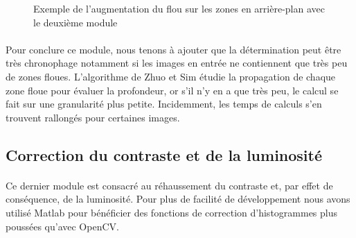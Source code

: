 \documentclass[11pt, french]{report-rd-info}
\begin{document}
\begin{figure}[htp]
 \caption{Exemple de l'augmentation du flou sur les zones en arrière-plan avec le deuxième module}
 \label{fig:ProfExemple}
\end{figure}

\paragraph*{}
Pour conclure ce module, nous tenons à ajouter que la détermination peut être très chronophage notamment si les images en entrée ne contiennent que très peu de zones floues. L'algorithme de Zhuo et Sim \cite{Zhuo2011} étudie la propagation de chaque zone floue pour évaluer la profondeur, or s'il n'y en a que très peu, le calcul se fait sur une granularité plus petite. Incidemment, les temps de calculs s'en trouvent rallongés pour certaines images. 

\subsection{Correction du contraste et de la luminosité}
\paragraph*{}
Ce dernier module est consacré au réhaussement du contraste et, par effet de conséquence, de la luminosité. Pour plus de facilité de développement nous avons utilisé Matlab pour bénéficier des fonctions de correction d'histogrammes plus poussées qu'avec OpenCV.
\end{document}
